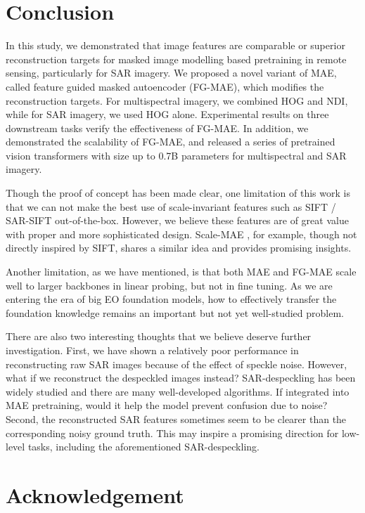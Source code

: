 \documentclass[lettersize,journal]{IEEEtran}
\begin{document}
\section{Conclusion}
\label{sec:conclusion}

In this study, we demonstrated that image features are comparable or superior reconstruction targets for masked image modelling based pretraining in remote sensing, particularly for SAR imagery. We proposed a novel variant of MAE, called feature guided masked autoencoder (FG-MAE), which modifies the reconstruction targets. For multispectral imagery, we combined HOG and NDI, while for SAR imagery, we used HOG alone. Experimental results on three downstream tasks verify the effectiveness of FG-MAE. In addition, we demonstrated the scalability of FG-MAE, and released a series of pretrained vision transformers with size up to 0.7B parameters for multispectral and SAR imagery.  

Though the proof of concept has been made clear, one limitation of this work is that we can not make the best use of scale-invariant features such as SIFT / SAR-SIFT out-of-the-box. However, we believe these features are of great value with proper and more sophisticated design. Scale-MAE \cite{reed2023scale}, for example, though not directly inspired by SIFT, shares a similar idea and provides promising insights.

Another limitation, as we have mentioned, is that both MAE and FG-MAE scale well to larger backbones in linear probing, but not in fine tuning. As we are entering the era of big EO foundation models, how to effectively transfer the foundation knowledge remains an important but not yet well-studied problem.

There are also two interesting thoughts that we believe deserve further investigation. First, we have shown a relatively poor performance in reconstructing raw SAR images because of the effect of speckle noise. However, what if we reconstruct the despeckled images instead? SAR-despeckling has been widely studied and there are many well-developed algorithms. If integrated into MAE pretraining, would it help the model prevent confusion due to noise? Second, the reconstructed SAR features sometimes seem to be clearer than the corresponding noisy ground truth. This may inspire a promising direction for low-level tasks, including the aforementioned SAR-despeckling.



\section*{Acknowledgement}
\end{document}
